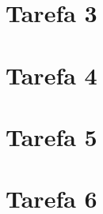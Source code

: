 \documentclass{article}
\begin{document}
\section{Tarefa 3}

\section{Tarefa 4}

\section{Tarefa 5}

\section{Tarefa 6}
\end{document}
